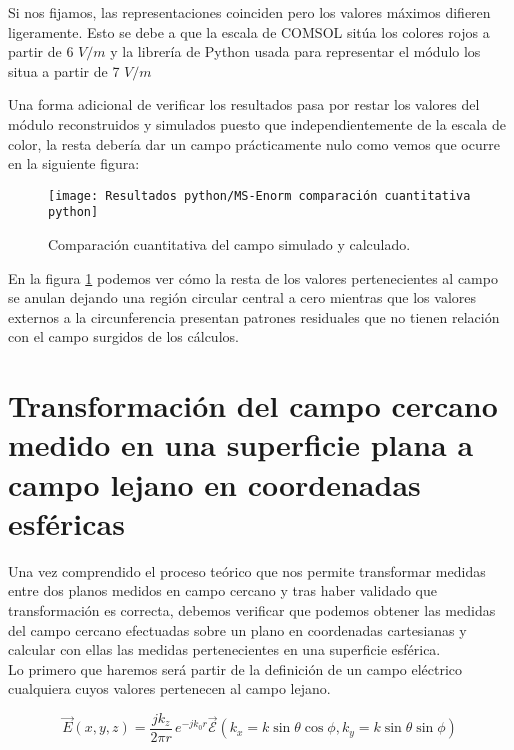 Si nos fijamos, las representaciones coinciden pero los valores máximos difieren ligeramente. Esto se debe a que la escala de COMSOL sitúa los colores rojos a partir de 6 $V/m$ y la librería de Python usada para representar el módulo los situa a partir de 7 $V/m$

\newpage

Una forma adicional de verificar los resultados pasa por restar los valores del módulo reconstruidos y simulados puesto que independientemente de la escala de color, la resta debería dar un campo prácticamente nulo como vemos que ocurre en la siguiente figura: 

\begin{figure}[h] 
  \centering
    \texttt{[image: Resultados python/MS-Enorm comparación cuantitativa python]}
    \caption{Comparación cuantitativa del campo simulado y calculado.}
    \label{IFFT 2D Ex a 15mm}
\end{figure}

En la figura \ref{IFFT 2D Ex a 15mm} podemos ver cómo la resta de los valores pertenecientes al campo se anulan dejando una región circular central a cero mientras que los valores externos a la circunferencia presentan patrones residuales que no tienen relación con el campo surgidos de los cálculos.

\newpage

\section{Transformación del campo cercano medido en una superficie plana a campo lejano en coordenadas esféricas}
\label{sec:validación NFtoNF esférico}

Una vez comprendido el proceso teórico que nos permite transformar medidas entre dos planos medidos en campo cercano y tras haber validado que transformación es correcta, debemos verificar que podemos obtener las medidas del campo cercano efectuadas sobre un plano en coordenadas cartesianas y calcular con ellas las medidas pertenecientes en una superficie esférica.\\

Lo primero que haremos será partir de la definición de un campo eléctrico cualquiera cuyos valores pertenecen al campo lejano.

\begin{equation}
\vec{E}(x,y,z)=\frac{jk_{z}}{2\pi r}\,e^{-jk_{0}r}{\vec{\mathcal{E}}}(k_{x}=k \sin\theta \cos\phi,k_{y}= k\sin\theta \sin\phi)
\label{NFtoFF:eq-campo-lejano}
\end{equation}

